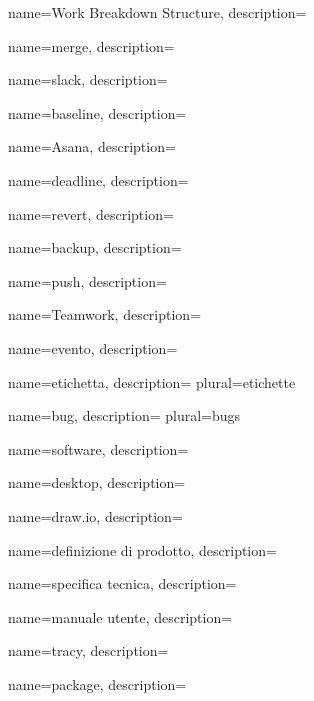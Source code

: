  {
	name=Work Breakdown Structure,
	description={\TODO{}}
}

 {
	name=merge,
	description={\TODO{}}
}

 {
	name=slack,
	description={\TODO{}}
}

 {
	name=baseline,
	description={\TODO{}}
}

 {
	name=Asana,
	description={\TODO{}}
}

 {
	name=deadline,
	description={\TODO{}}
}

 {
	name=revert,
	description={\TODO{}}
}

 {
	name=backup,
	description={\TODO{}}
}

 {
	name=push,
	description={\TODO{}}
}

 {
	name=Teamwork,
	description={\TODO{}}
}

 {
	name=evento,
	description={\TODO{}}
}

 {
	name=etichetta,
	description={\TODO{}}
	plural=etichette
}

 {
	name=bug,
	description={\TODO{}}
	plural=bugs
}

 {
	name=software,
	description={\TODO{}}
}

 {
	name=desktop,
	description={\TODO{}}
}

 {
	name=draw.io,
	description={\TODO{}}
}

 {
	name=definizione di prodotto,
	description={\TODO{}}
}

 {
	name=specifica tecnica,
	description={\TODO{}}
}

 {
	name=manuale utente,
	description={\TODO{}}
}

 {
	name=tracy,
	description={\TODO{}}
}

 {
	name=package,
	description={\TODO{}}
}
